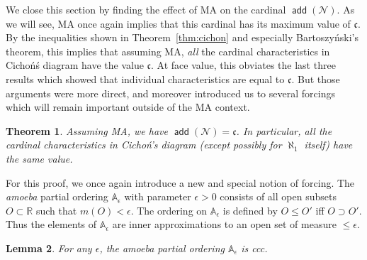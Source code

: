 \documentclass[11pt,oneside,a4paper]{amsbook}
\newcommand{\R}{\mathbb R}
\newcommand{\Null}{\mathcal N}
\DeclareMathOperator{\add}{\mathsf{add}}
\theoremstyle{definition}
\theoremstyle{plain}
\newtheorem{theorem}{Theorem}[section]
\newtheorem{lemma}[theorem]{Lemma}
\theoremstyle{definition}
\theoremstyle{remark}
\numberwithin{equation}{section}
\numberwithin{figure}{section}
\begin{document}
We close this section by finding the effect of MA on the cardinal $\add(\Null)$. As we will see, MA once again implies that this cardinal has its maximum value of $\mathfrak c$. By the inequalities shown in Theorem~\ref{thm:cichon} and especially Bartoszy\'nski's theorem, this implies that assuming MA, \emph{all} the cardinal characteristics in Cicho\'n\'s diagram have the value $\mathfrak c$. At face value, this obviates the last three results which showed that individual characteristics are equal to $\mathfrak c$. But those arguments were more direct, and moreover introduced us to several forcings which will remain important outside of the MA context.

\begin{theorem}
  \label{thm:ma-addn}
  Assuming MA, we have $\add(\Null)=\mathfrak c$. In particular, all the cardinal characteristics in Cicho\'n's diagram (except possibly for $\aleph_1$ itself) have the same value.
\end{theorem}

For this proof, we once again introduce a new and special notion of forcing. The \emph{amoeba} partial ordering $\mathbb A_\epsilon$ with parameter $\epsilon>0$ consists of all open subsets $O\subset\R$ such that $m(O)<\epsilon$. The ordering on $\mathbb A_\epsilon$ is defined by $O\leq O'$ iff $O\supset O'$. Thus the elements of $\mathbb A_\epsilon$ are inner approximations to an open set of measure $\leq\epsilon$.

\begin{lemma}
  For any $\epsilon$, the amoeba partial ordering $\mathbb A_\epsilon$ is ccc.
\end{lemma}
\end{document}
